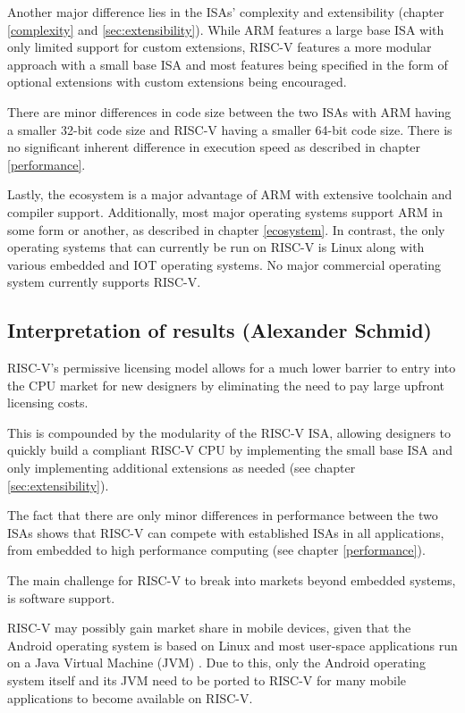 \documentclass[conference]{IEEEtran}
\begin{document}
	Another major difference lies in the \glspl{ISA}' complexity and extensibility (chapter \ref{complexity} and \ref{sec:extensibility}).
	While ARM features a large base \gls{ISA} with only limited support for custom extensions, RISC-V features a more modular
	approach with a small base \gls{ISA} and most features being specified in the form of optional extensions with custom extensions being
	encouraged.

	There are minor differences in code size between the two \glspl{ISA} with ARM having a smaller 32-bit code size and RISC-V having a
	smaller 64-bit code size. There is no significant inherent difference in execution speed as described in chapter \ref{performance}.

	Lastly, the ecosystem is a major advantage of ARM with extensive toolchain and compiler support. Additionally, most major operating systems
	support ARM in some form or another, as described in chapter \ref{ecosystem}.
	In contrast, the only operating systems that can currently be run on RISC-V is Linux along with various embedded and IOT operating systems.
	No major commercial operating system currently supports RISC-V.

	\subsection{Interpretation of results (Alexander Schmid)}
	\label{ref:interpretation}
	RISC-V's permissive licensing model allows for a much lower barrier to entry into the \gls{CPU} market for new designers
	by eliminating the need to pay large upfront licensing costs.
	
	This is compounded by the modularity of the RISC-V \gls{ISA}, allowing designers to quickly build a compliant RISC-V \gls{CPU}
	by implementing the small base \gls{ISA} and only implementing additional extensions as needed (see chapter \ref{sec:extensibility}).

	The fact that there are only minor differences in performance between the two \glspl{ISA} shows that RISC-V can
	compete with established \glspl{ISA} in all applications, from embedded to high performance computing (see chapter \ref{performance}).

	The main challenge for RISC-V to break into markets beyond embedded systems, is software support.
	
	RISC-V may possibly gain market share in mobile devices, given that the Android operating
	system is based on Linux and most user-space applications
	run on a Java Virtual Machine (JVM) \cite{Ehringer2010}. Due to this, only
	the Android operating system itself and its JVM need to be
	ported to RISC-V for many mobile applications to
	become available on RISC-V.
\end{document}
